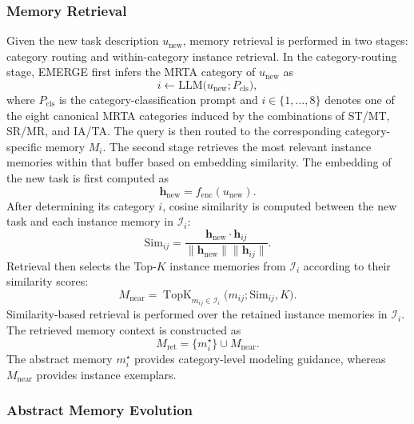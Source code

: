 \documentclass[letterpaper,journal]{IEEEtran}
\begin{document}
\subsubsection{Memory Retrieval}
Given the new task description \(u_{\mathrm{new}}\), memory retrieval is performed in two stages: category routing and within-category instance retrieval. In the category-routing stage, EMERGE first infers the MRTA category of \(u_{\mathrm{new}}\) as
\begin{equation}
i \leftarrow \mathrm{LLM}\bigl(u_{\mathrm{new}} ; P_{\mathrm{cls}}\bigr),
\end{equation}
where \(P_{\mathrm{cls}}\) is the category-classification prompt and \(i \in \{1,\dots,8\}\) denotes one of the eight canonical MRTA categories induced by the combinations of ST/MT, SR/MR, and IA/TA. The query is then routed to the corresponding category-specific memory \(M_i\). The second stage retrieves the most relevant instance memories within that buffer based on embedding similarity. The embedding of the new task is first computed as
\begin{equation}
\mathbf{h}_{\mathrm{new}} = f_{\mathrm{enc}}(u_{\mathrm{new}}).
\end{equation}
After determining its category \(i\), cosine similarity is computed between the new task and each instance memory in \(\mathcal{I}_i\):
\begin{equation}
\mathrm{Sim}_{ij} =
\frac{\mathbf{h}_{\mathrm{new}} \cdot \mathbf{h}_{ij}}
{\|\mathbf{h}_{\mathrm{new}}\| \|\mathbf{h}_{ij}\|}.
\end{equation}
Retrieval then selects the Top-\(K\) instance memories from \(\mathcal{I}_i\) according to their similarity scores:
\begin{equation}
M_{\mathrm{near}} =
\operatorname{TopK}_{m_{ij}\in\mathcal{I}_i}
\bigl(m_{ij}; \mathrm{Sim}_{ij}, K\bigr).
\end{equation}
Similarity-based retrieval is performed over the retained instance memories in $\mathcal{I}_i$. The retrieved memory context is constructed as
\begin{equation}
M_{\mathrm{ret}} = \{ m_i^{\star} \} \cup M_{\mathrm{near}} .
\end{equation}
The abstract memory \(m_i^{\star}\) provides category-level modeling guidance, whereas \(M_{\mathrm{near}}\) provides instance exemplars.


\subsubsection{Abstract Memory Evolution}
\end{document}
